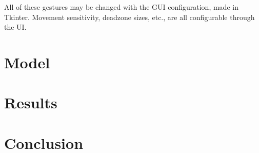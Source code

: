 \documentclass{article}
\begin{document}
All of these gestures may be changed with the GUI configuration, made in Tkinter. Movement sensitivity, deadzone sizes, etc., are all configurable through the UI.

\section{Model}

\section{Results}
\section{Conclusion}


\pagebreak
\nocite{*} %
\printbibliography %
\end{document}
